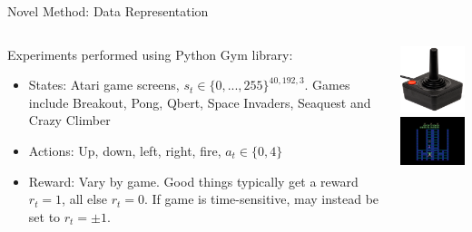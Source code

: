 \documentclass[pdf]{beamer}
\begin{document}
\begin{frame}[fragile]{Novel Method: Data Representation}
\begin{minipage}[0.2\textheight]{\textwidth}
\begin{columns}[T]
\begin{column}{0.6\textwidth}
Experiments performed using Python Gym library:
\begin{itemize}
\item States: Atari game screens, $s_t \in \{0,...,255 \} ^{40,192,3}$. Games include Breakout, Pong, Qbert, Space Invaders, Seaquest and Crazy Climber
\item Actions: Up, down, left, right, fire, $a_t \in \{ 0,4 \}$
\item Reward: Vary by game. Good things typically get a reward $r_t = 1$, all else $r_t=0$. If game is time-sensitive, may instead be set to $r_t=\pm 1$.
\end{itemize}
\end{column}
\begin{column}{0.4\textwidth}
\includegraphics[width=4cm]{Images/atari.jpg}
\\
\includegraphics[width=4cm]{Images/crazy.png}
\end{column}
\end{columns}
\end{minipage}
\end{frame}
\end{document}
